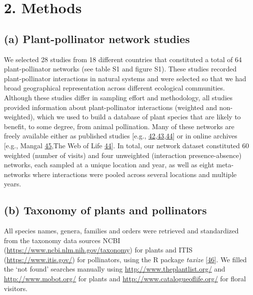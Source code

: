 \documentclass[
  12pt,
  a4paper,
]{article}
\begin{document}
\hypertarget{methods}{%
\section{2. Methods}\label{methods}}

\hypertarget{a-plant-pollinator-network-studies}{%
\subsection{(a) Plant-pollinator network studies}\label{a-plant-pollinator-network-studies}}

We selected 28 studies from 18 different countries that constituted a total of 64 plant-pollinator networks (see table S1 and figure S1). These studies recorded plant-pollinator interactions in natural systems and were selected so that we had broad geographical representation across different ecological communities. Although these studies differ in sampling effort and methodology, all studies provided information about plant-pollinator interactions (weighted and non-weighted), which we used to build a database of plant species that are likely to benefit, to some degree, from animal pollination. Many of these networks are freely available either as published studies {[}e.g., \protect\hyperlink{ref-carvalheiro2014}{42},\protect\hyperlink{ref-olesen2007}{43},\protect\hyperlink{ref-fortuna2010}{44}{]} or in online archives {[}e.g., Mangal \protect\hyperlink{ref-poisot2016}{45},The Web of Life \protect\hyperlink{ref-fortuna2010}{44}{]}. In total, our network dataset constituted 60 weighted (number of visits) and four unweighted (interaction presence-absence) networks, each sampled at a unique location and year, as well as eight meta-networks where interactions were pooled across several locations and multiple years.

\hypertarget{b-taxonomy-of-plants-and-pollinators}{%
\subsection{(b) Taxonomy of plants and pollinators}\label{b-taxonomy-of-plants-and-pollinators}}

All species names, genera, families and orders were retrieved and standardized from the taxonomy data sources NCBI (\url{https://www.ncbi.nlm.nih.gov/taxonomy}) for plants and ITIS (\url{https://www.itis.gov/}) for pollinators, using the R package \emph{taxize} {[}\protect\hyperlink{ref-chamberlain2020}{46}{]}. We filled the `not found' searches manually using \url{http://www.theplantlist.org/} and \url{http://www.mobot.org/} for plants and \url{http://www.catalogueoflife.org/} for floral visitors.
\end{document}
